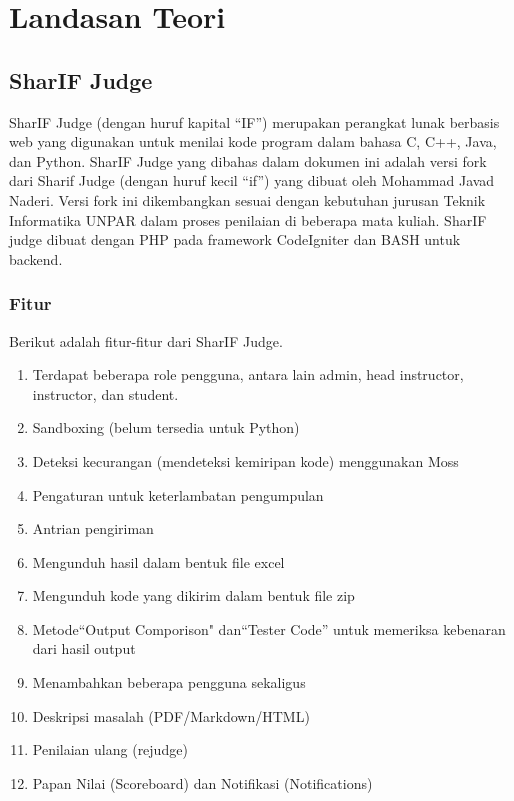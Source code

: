 \chapter{Landasan Teori}
\label{chap:teori}

\section{SharIF Judge}
\label{sec:sharifjudge} 
 
SharIF Judge \cite{SharIF_Judge} (dengan huruf kapital ``IF'') merupakan perangkat lunak berbasis web yang digunakan untuk menilai kode program dalam bahasa C, C++, Java, dan Python. SharIF Judge yang dibahas dalam dokumen ini adalah versi fork dari Sharif Judge \cite{Sharif_Judge_Original} (dengan huruf kecil ``if'') yang dibuat oleh Mohammad Javad Naderi. Versi fork ini dikembangkan sesuai dengan kebutuhan jurusan Teknik Informatika UNPAR dalam proses penilaian di beberapa mata kuliah. SharIF judge dibuat dengan PHP pada framework CodeIgniter dan BASH untuk backend.

\subsection{Fitur}
Berikut adalah fitur-fitur dari SharIF Judge.
\begin{enumerate}
	\item  Terdapat beberapa role pengguna, antara lain admin, head instructor, instructor, dan student.
	\item  Sandboxing (belum tersedia untuk Python)
	\item Deteksi kecurangan (mendeteksi kemiripan kode) menggunakan Moss
	\item Pengaturan untuk keterlambatan pengumpulan
	\item Antrian pengiriman
	\item Mengunduh hasil dalam bentuk file excel
	\item Mengunduh kode yang dikirim dalam bentuk file zip
	\item Metode``Output Comporison" dan``Tester Code'' untuk memeriksa kebenaran dari hasil output
	\item Menambahkan beberapa pengguna sekaligus
	\item Deskripsi masalah (PDF/Markdown/HTML)
	\item Penilaian ulang (rejudge)
	\item Papan Nilai (Scoreboard) dan Notifikasi (Notifications)
	
\end{enumerate}

